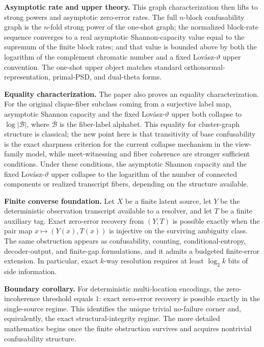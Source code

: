 \noindent\textbf{Asymptotic rate and upper theory.} This graph characterization then lifts to strong powers and asymptotic zero-error rates. The full $n$-block confusability graph is the $n$-fold strong power of the one-shot graph; the normalized block-rate sequence converges to a real asymptotic Shannon-capacity value equal to the supremum of the finite block rates; and that value is bounded above by both the logarithm of the complement chromatic number and a fixed Lov\'asz-$\vartheta$ upper convention. The one-shot upper object matches standard orthonormal-representation, primal-PSD, and dual-theta forms. 

\noindent\textbf{Equality characterization.} The paper also proves an equality characterization. For the original clique-fiber subclass coming from a surjective label map, asymptotic Shannon capacity and the fixed Lov\'asz-$\vartheta$ upper both collapse to $\log |\mathcal B|$, where $\mathcal B$ is the fiber-label alphabet. This equality for cluster-graph structure is classical; the new point here is that transitivity of base confusability is the exact sharpness criterion for the current collapse mechanism in the view-family model, while meet-witnessing and fiber coherence are stronger sufficient conditions. Under these conditions, the asymptotic Shannon capacity and the fixed Lov\'asz-$\vartheta$ upper collapse to the logarithm of the number of connected components or realized transcript fibers, depending on the structure available. 

\noindent\textbf{Finite converse foundation.} Let $X$ be a finite latent source, let $Y$ be the deterministic observation transcript available to a resolver, and let $T$ be a finite auxiliary tag. Exact zero-error recovery from $(Y,T)$ is possible exactly when the pair map $x \mapsto (Y(x),T(x))$ is injective on the surviving ambiguity class. The same obstruction appears as confusability, counting, conditional-entropy, decoder-output, and finite-gap formulations, and it admits a budgeted finite-error extension. In particular, exact $k$-way resolution requires at least $\log_2 k$ bits of side information.

\noindent\textbf{Boundary corollary.} For deterministic multi-location encodings, the zero-incoherence threshold equals $1$: exact zero-error recovery is possible exactly in the single-source regime. This identifies the unique trivial no-failure corner and, equivalently, the exact structural-integrity regime. The more detailed mathematics begins once the finite obstruction survives and acquires nontrivial confusability structure.

